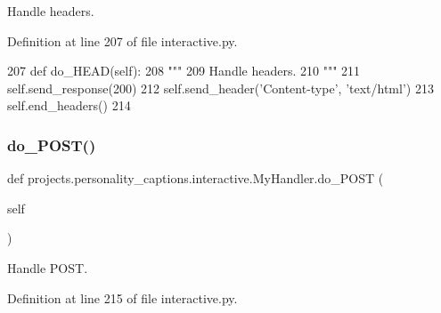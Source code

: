 \begin{DoxyVerb}Handle headers.
\end{DoxyVerb}
 

Definition at line 207 of file interactive.\+py.


\begin{DoxyCode}
207     \textcolor{keyword}{def }do\_HEAD(self):
208         \textcolor{stringliteral}{"""}
209 \textcolor{stringliteral}{        Handle headers.}
210 \textcolor{stringliteral}{        """}
211         self.send\_response(200)
212         self.send\_header(\textcolor{stringliteral}{'Content-type'}, \textcolor{stringliteral}{'text/html'})
213         self.end\_headers()
214 
\end{DoxyCode}
\mbox{\label{classprojects_1_1personality__captions_1_1interactive_1_1MyHandler_a846c973c3c91308218b79f84396265ac}} 
\subsubsection{\texorpdfstring{do\+\_\+\+P\+O\+S\+T()}{do\_POST()}}
{\footnotesize\ttfamily def projects.\+personality\+\_\+captions.\+interactive.\+My\+Handler.\+do\+\_\+\+P\+O\+ST (\begin{DoxyParamCaption}\item[{}]{self }\end{DoxyParamCaption})}

\begin{DoxyVerb}Handle POST.
\end{DoxyVerb}
 

Definition at line 215 of file interactive.\+py.


